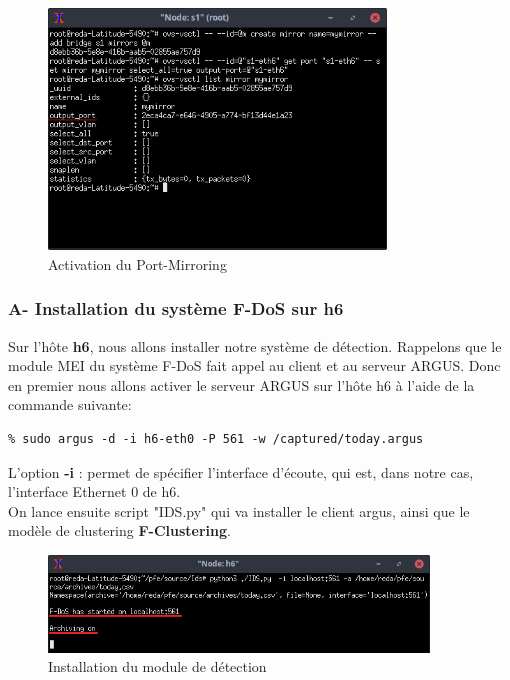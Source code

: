 \begin{figure}[h]
\centering
\includegraphics[width=0.8\textwidth]{Figures/simulation/mininet/switch/create_mirroring_port}
\decoRule
\caption{Activation du Port-Mirroring}
\label{fig:topologie}
\end{figure}

\newpage
\subsubsection{A- Installation du système F-DoS sur h6}
Sur l'hôte \textbf{h6}, nous allons installer notre système de détection. Rappelons que le module MEI du système F-DoS fait appel au client et au serveur ARGUS. Donc en premier nous allons activer le serveur ARGUS sur l'hôte h6 à l'aide de la commande suivante:
\begin{verbatim}
% sudo argus -d -i h6-eth0 -P 561 -w /captured/today.argus
\end{verbatim}
L'option \textbf{-i} : permet de spécifier l'interface d'écoute, qui est, dans notre cas, l'interface Ethernet 0 de h6.\\

\noindent On lance ensuite script "IDS.py" qui va installer le client argus, ainsi que le modèle de clustering \textbf{F-Clustering}.
\begin{figure}[h]
\centering
\includegraphics[width=0.9\textwidth]{Figures/simulation/mininet/IDS/start}
\decoRule
\caption{Installation du module de détection}
\label{fig:topologie}
\end{figure}
\newpage
